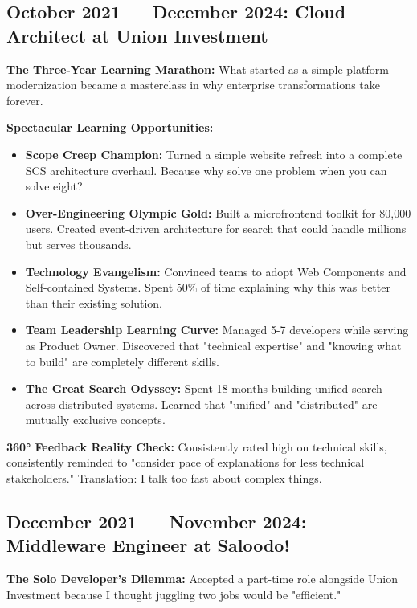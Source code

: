 \documentclass[10pt,a4paper]{article}
\begin{document}
\subsection{October 2021 — December 2024: Cloud Architect at Union Investment}
\textbf{The Three-Year Learning Marathon:} What started as a simple platform modernization became a masterclass in why enterprise transformations take forever.

\textbf{Spectacular Learning Opportunities:}
\begin{itemize}[leftmargin=1em, itemsep=0.2em]
\item \textbf{Scope Creep Champion:} Turned a simple website refresh into a complete SCS architecture overhaul. Because why solve one problem when you can solve eight?
\item \textbf{Over-Engineering Olympic Gold:} Built a microfrontend toolkit for 80,000 users. Created event-driven architecture for search that could handle millions but serves thousands.
\item \textbf{Technology Evangelism:} Convinced teams to adopt Web Components and Self-contained Systems. Spent 50\% of time explaining why this was better than their existing solution.
\item \textbf{Team Leadership Learning Curve:} Managed 5-7 developers while serving as Product Owner. Discovered that "technical expertise" and "knowing what to build" are completely different skills.
\item \textbf{The Great Search Odyssey:} Spent 18 months building unified search across distributed systems. Learned that "unified" and "distributed" are mutually exclusive concepts.
\end{itemize}

\textbf{360° Feedback Reality Check:} Consistently rated high on technical skills, consistently reminded to "consider pace of explanations for less technical stakeholders." Translation: I talk too fast about complex things.

\subsection{December 2021 — November 2024: Middleware Engineer at Saloodo!}
\textbf{The Solo Developer's Dilemma:} Accepted a part-time role alongside Union Investment because I thought juggling two jobs would be "efficient."
\end{document}
